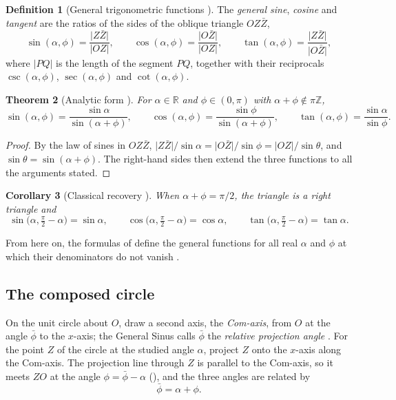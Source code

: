 \documentclass[11pt,a4paper]{amsart}
\theoremstyle{plain}
\newtheorem{theorem}{Theorem}[section]
\newtheorem{corollary}[theorem]{Corollary}
\theoremstyle{definition}
\newtheorem{definition}[theorem]{Definition}
\theoremstyle{remark}
\newcommand{\pb}{\bar{\phi}}                     %
\newcommand{\R}{\mathbb{R}}
\newcommand{\seg}[1]{\lvert #1\rvert}            %
\newcommand{\Zb}{\bar{Z}}                        %
\begin{document}
\begin{definition}[General trigonometric functions {\citep[Definition~3.6]{Derraz2026GSP}}]\label{def:gs}
The \emph{general sine}, \emph{cosine} and \emph{tangent} are the ratios of the sides of the oblique triangle $OZ\Zb$,
\[
\sin(\alpha, \phi) = \frac{\seg{Z\Zb}}{\seg{OZ}} , \qquad \cos(\alpha, \phi) = \frac{\seg{O\Zb}}{\seg{OZ}} , \qquad \tan(\alpha, \phi) = \frac{\seg{Z\Zb}}{\seg{O\Zb}} ,
\]
where $\seg{PQ}$ is the length of the segment $PQ$, together with their reciprocals $\csc(\alpha, \phi)$, $\sec(\alpha, \phi)$ and $\cot(\alpha, \phi)$.
\end{definition}

\begin{theorem}[Analytic form {\citep[Theorem~3.7]{Derraz2026GSP}}]\label{thm:gs-analytic}
For $\alpha \in \R$ and $\phi \in (0, \pi)$ with $\alpha + \phi \notin \pi\mathbb{Z}$,
\[
\sin(\alpha, \phi) = \frac{\sin\alpha}{\sin(\alpha + \phi)} , \qquad \cos(\alpha, \phi) = \frac{\sin\phi}{\sin(\alpha + \phi)} , \qquad \tan(\alpha, \phi) = \frac{\sin\alpha}{\sin\phi} .
\]
\end{theorem}

\begin{proof}
By the law of sines in $OZ\Zb$, $\seg{Z\Zb}/\sin\alpha = \seg{O\Zb}/\sin\phi = \seg{OZ}/\sin\theta$, and $\sin\theta = \sin(\alpha + \phi)$. The right-hand sides then extend the three functions to all the arguments stated.
\end{proof}

\begin{corollary}[Classical recovery {\citep[Corollary~3.8]{Derraz2026GSP}}]\label{cor:gs-classical}
When $\alpha + \phi = \pi/2$, the triangle is a right triangle and
\[
\sin\bigl(\alpha, \tfrac{\pi}{2} - \alpha\bigr) = \sin\alpha , \qquad \cos\bigl(\alpha, \tfrac{\pi}{2} - \alpha\bigr) = \cos\alpha , \qquad \tan\bigl(\alpha, \tfrac{\pi}{2} - \alpha\bigr) = \tan\alpha .
\]
\end{corollary}

From here on, the formulas of  define the general functions for all real $\alpha$ and $\phi$ at which their denominators do not vanish \citep[Proposition~4.1 and Remark~4.2]{Derraz2026GSP}.

\subsection{The composed circle}\label{subsec:gs-circle}

On the unit circle about $O$, draw a second axis, the \emph{Com-axis}, from $O$ at the angle $\pb$ to the $x$-axis; the General Sinus calls $\pb$ the \emph{relative projection angle} \citep[Definitions~2.2 and~2.3]{Derraz2026GSP}. For the point $Z$ of the circle at the studied angle $\alpha$, project $Z$ onto the $x$-axis along the Com-axis. The projection line through $Z$ is parallel to the Com-axis, so it meets $ZO$ at the angle $\phi = \pb - \alpha$ (), and the three angles are related by \citep[(2.1)]{Derraz2026GSP}
\[
\pb = \alpha + \phi .
\]
\end{document}
